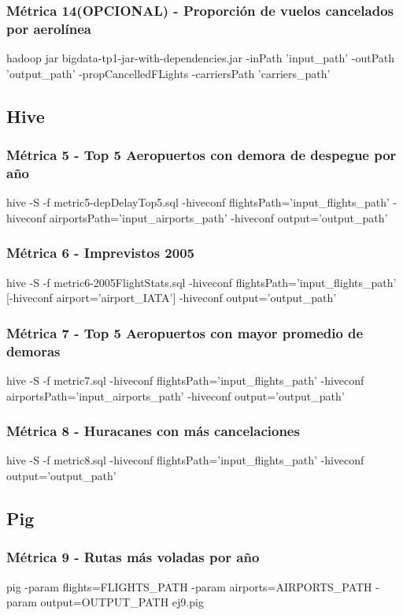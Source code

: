 \documentclass[a4paper,10pt]{article}
\begin{document}
        \subsubsection{Métrica 14(OPCIONAL) - Proporción de vuelos cancelados por aerolínea}
            \footnotesize{hadoop jar bigdata-tp1-jar-with-dependencies.jar -inPath 'input\_path' -outPath 'output\_path' -propCancelledFLights -carriersPath 'carriers\_path'}

    \subsection{Hive}
        \subsubsection{Métrica 5 - Top 5 Aeropuertos con demora de despegue por año}
        \footnotesize{hive -S -f metric5-depDelayTop5.sql -hiveconf flightsPath='input\_flights\_path' -hiveconf airportsPath='input\_airports\_path' -hiveconf output='output\_path'}
        \subsubsection{Métrica 6 - Imprevistos 2005}
        \footnotesize{hive -S -f metric6-2005FlightStats.sql -hiveconf flightsPath='input\_flights\_path' [-hiveconf airport='airport\_IATA'] -hiveconf output='output\_path'}
        \subsubsection{Métrica 7 - Top 5 Aeropuertos con mayor promedio de demoras}
        \footnotesize{hive -S -f metric7.sql -hiveconf flightsPath='input\_flights\_path' -hiveconf airportsPath='input\_airports\_path' -hiveconf output='output\_path'}
        \subsubsection{Métrica 8 - Huracanes con más cancelaciones}
        \footnotesize{hive -S -f metric8.sql -hiveconf flightsPath='input\_flights\_path' -hiveconf output='output\_path'}

    \subsection{Pig}
        \subsubsection{Métrica 9 - Rutas más voladas por año}
            \footnotesize{pig -param flights=FLIGHTS\_PATH -param airports=AIRPORTS\_PATH -param output=OUTPUT\_PATH ej9.pig}
\end{document}
